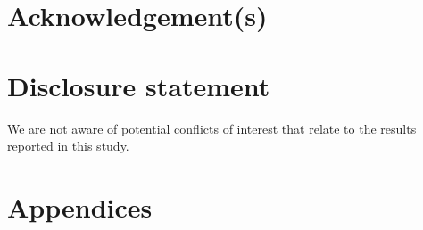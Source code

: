 \documentclass[]{interact}
\begin{document}
\section*{Acknowledgement(s)}


\section*{Disclosure statement}

We are not aware of potential conflicts of interest that relate to the results reported in this study.



\newpage





\newpage
\section{Appendices}

\appendix
\end{document}
